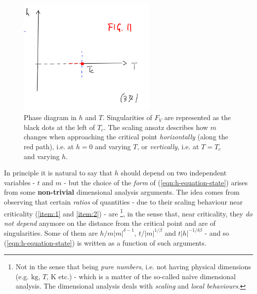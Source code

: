 \documentclass[../../main.tex]{subfiles}
\begin{document}
\begin{figure}[H]
    \centering
    \includegraphics[width=0.6\textwidth]{criticality-vicinity.png}
    \caption{Phase diagram in $h$ and $T$. Singularities of $F_V$ are represented as the black dots at the left of $T_c$. The scaling ansatz describes how $m$ changes when approaching the critical point \textit{horizontally} (along the red path), i.e. at $h=0$ and varying $T$, or \textit{vertically}, i.e. at $T = T_c$ and varying $h$.}
    \label{fig:criticality-vicinity}
\end{figure}

In principle it is natural to say that $h$ should depend on two independent variables - $t$ and $m$ - but the choice of the \textit{form} of (\ref{eqn:h-equation-state}) arises from some \textbf{non-trivial} dimensional analysis arguments. The idea comes from observing that certain \textit{ratios} of quantities - due to their scaling behaviour near criticality (\ref{item:1} and \ref{item:2}) - are \footnote{Not in the sense that being \textit{pure numbers}, i.e. not having physical dimensions (e.g. $\si{\kilo\g}$, $\si{T}$, $\si{\K}$ etc.) - which is a matter of the so-called na\"ive dimensional analysis. The  dimensional analysis deals with \textit{scaling} and \textit{local behaviours}.}, in the sense that, near criticality, they \textit{do not depend} anymore on the distance from the critical point and are  of singularities. Some of them are $h/m|m|^{\delta-1}$, $t/|m|^{1/\beta}$ and $t|h|^{-1/\delta \beta}$ - and so (\ref{eqn:h-equation-state}) is written as a function of such arguments.
\end{document}
